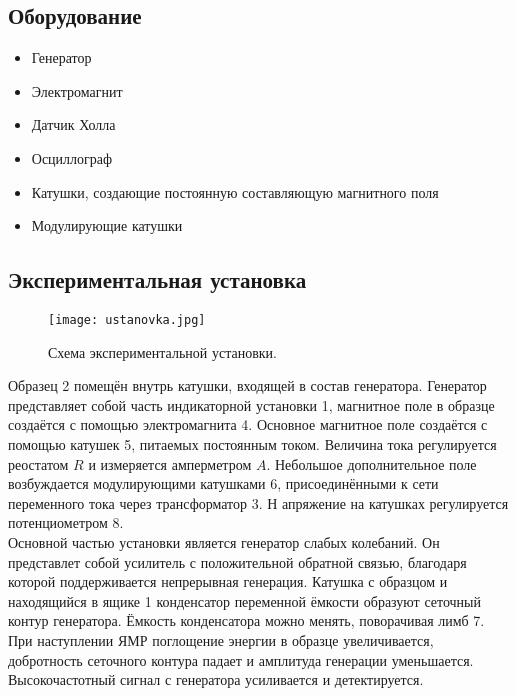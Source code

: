 \documentclass[a4paper, 14pt]{article}
\begin{document}
\subsection*{\textcolor{sub_header}{Оборудование}}
\begin{itemize}
    \item Генератор
    \item Электромагнит 
    \item Датчик Холла
    \item Осциллограф 
    \item Катушки, создающие постоянную составляющую магнитного поля
    \item Модулирующие катушки 
\end{itemize}

\subsection*{\textcolor{sub_header}{Экспериментальная установка}}

\begin{figure}[htbp]
    \centering
    \texttt{[image: ustanovka.jpg]}
    \caption{Схема экспериментальной установки.}
    \label{fig:ustanovka}
\end{figure}


Образец 2 помещён внутрь катушки, входящей в состав генератора. 
Генератор представляет собой часть индикаторной установки 1, магнитное поле в образце создаётся с помощью электромагнита 4.
Основное магнитное поле создаётся с помощью катушек 5, питаемых постоянным током.
Величина тока регулируется реостатом $R$ и измеряется амперметром $A$. 
Небольшое дополнительное поле возбуждается модулирующими катушками 6, присоединёнными к сети переменного тока через трансформатор 3. Н
апряжение на катушках регулируется потенциометром 8.\\

Основной частью установки является генератор слабых колебаний.
Он представлет собой усилитель с положительной обратной связью, благодаря которой поддерживается непрерывная генерация.
Катушка с образцом и находящийся в ящике 1 конденсатор переменной ёмкости образуют сеточный контур генератора. 
Ёмкость конденсатора можно менять, поворачивая лимб 7. 
При наступлении ЯМР поглощение энергии в образце увеличивается, добротность сеточного контура падает и амплитуда генерации уменьшается. 
Высокочастотный сигнал с генератора усиливается и детектируется.\\
\end{document}

